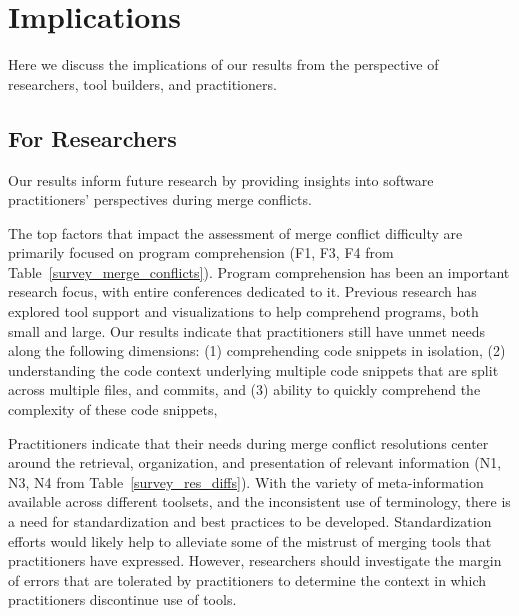 \section{Implications}\label{implications}
Here we discuss the implications of our results from the perspective of researchers, tool builders, and practitioners.

\subsection{For Researchers}
Our results inform future research by providing insights into software practitioners' perspectives during merge conflicts.

The top factors that impact the assessment of merge conflict difficulty are primarily focused on program comprehension (F1, F3, F4 from Table~\ref{survey_merge_conflicts}).
Program comprehension has been an important research focus, with entire conferences dedicated to it.
Previous research has explored tool support and visualizations to help comprehend programs, both small and large.
Our results indicate that practitioners still have unmet needs along the following dimensions: (1) comprehending code snippets in isolation, (2) understanding the code context underlying multiple code snippets that are split across multiple files, and commits, and (3) ability to quickly comprehend the complexity of these code snippets, 


Practitioners indicate that their needs during merge conflict resolutions center around the retrieval, organization, and presentation of relevant information (N1, N3, N4 from Table~\ref{survey_res_diffs}).
With the variety of meta-information available across different toolsets, and the inconsistent use of terminology, there is a need for standardization and best practices to be developed.
Standardization efforts would likely help to alleviate some of the mistrust of merging tools that practitioners have expressed.
However, researchers should investigate the margin of errors that are tolerated by practitioners to determine the context in which practitioners discontinue use of tools.

